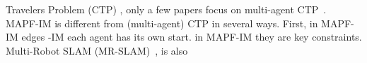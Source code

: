 \documentclass[letterpaper]{article} %
\def\
UrlFont{\rm}  %
\newcommand{\roni}[1]{\textbf{[\color{orange}RONI:#1]}}
\theoremstyle{definition}
\begin{document}
 Travelers Problem (CTP) \cite{zhang2013k},   only a few papers focus on multi-agent CTP~\cite{shiri2017online,shiri2019randomized}.
MAPF-IM is different from (multi-agent) CTP in several ways. First, in MAPF-IM edges  -IM each agent has its own start.
 in MAPF-IM they are key constraints.
Multi-Robot SLAM (MR-SLAM)~\cite{burgard2000collaborative,kshirsagar2018survey,abdulgalil2019multi}, is also    


\end{document}
